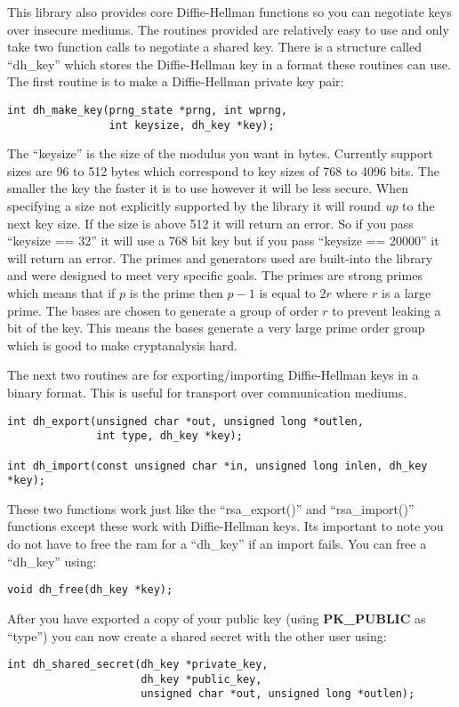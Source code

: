 \documentclass[synpaper]{book}
\begin{document}
This library also provides core Diffie-Hellman functions so you can negotiate keys over insecure mediums.  The routines
provided are relatively easy to use and only take two function calls to negotiate a shared key.  There is a structure
called ``dh\_key'' which stores the Diffie-Hellman key in a format these routines can use.  The first routine is to
make a Diffie-Hellman private key pair:
\begin{verbatim}
int dh_make_key(prng_state *prng, int wprng,
                int keysize, dh_key *key);
\end{verbatim}
The ``keysize'' is the size of the modulus you want in bytes.  Currently support sizes are 96 to 512 bytes which correspond
to key sizes of 768 to 4096 bits. The smaller the key the faster it is to use however it will be less secure.  When
specifying a size not explicitly supported by the library it will round {\em up} to the next key size.  If the size is
above 512 it will return an error.  So if you pass ``keysize == 32'' it will use a 768 bit key but if you pass
``keysize == 20000'' it will return an error.  The primes and generators used are built-into the library and were designed
to meet very specific goals.  The primes are strong primes which means that if $p$ is the prime then
$p-1$ is equal to $2r$ where $r$ is a large prime.  The bases are chosen to generate a group of order $r$ to prevent
leaking a bit of the key.  This means the bases generate a very large prime order group which is good to make cryptanalysis
hard.

The next two routines are for exporting/importing Diffie-Hellman keys in a binary format.  This is useful for transport
over communication mediums.

 
\begin{verbatim}
int dh_export(unsigned char *out, unsigned long *outlen,
              int type, dh_key *key);

int dh_import(const unsigned char *in, unsigned long inlen, dh_key *key);
\end{verbatim}

These two functions work just like the ``rsa\_export()'' and ``rsa\_import()'' functions except these work with
Diffie-Hellman keys. Its important to note you do not have to free the ram for a ``dh\_key'' if an import fails.  You can free a
``dh\_key'' using:
\begin{verbatim}
void dh_free(dh_key *key);
\end{verbatim}
After you have exported a copy of your public key (using {\bf PK\_PUBLIC} as ``type'') you can now create a shared secret
with the other user using:
\begin{verbatim}
int dh_shared_secret(dh_key *private_key,
                     dh_key *public_key,
                     unsigned char *out, unsigned long *outlen);
\end{verbatim}
\end{document}
